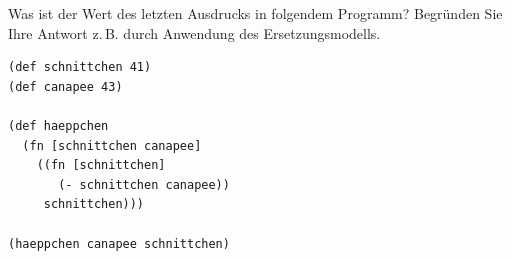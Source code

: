 \documentclass[12pt]{exam}
\begin{document}
\begin{questions}


\pagebreak
\question[12]
Was ist der Wert des letzten Ausdrucks in folgendem Programm? Begründen Sie Ihre Antwort z.\,B. durch Anwendung des Ersetzungsmodells.
\begin{verbatim}
(def schnittchen 41)
(def canapee 43)

(def haeppchen
  (fn [schnittchen canapee]
    ((fn [schnittchen]
       (- schnittchen canapee))
     schnittchen)))

(haeppchen canapee schnittchen)
\end{verbatim}

\pagebreak


\end{questions}
\end{document}
